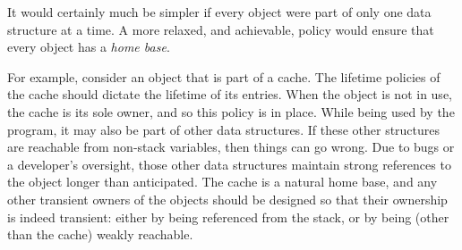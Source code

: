 It would certainly much be simpler if every object were part of only one data
structure at a time.
A more relaxed, and achievable, policy would ensure that every object has a 
\emph{home base}. 

For example, consider an object that is part of a cache. The lifetime policies
of the cache should dictate the lifetime of its entries. When the object is not
in use, the cache is its sole owner, and so this policy is in place.
While being used by the program, it may also be part of other data structures.
If these other structures are reachable from non-stack variables, then things
can go wrong. Due to bugs or a developer's oversight, those other data
structures maintain strong references to the object longer than anticipated.
The cache is a natural home base, and any other transient owners of the objects
should be designed so that their ownership is indeed transient: either by being
referenced from the stack, or by being (other than the cache) weakly reachable.

